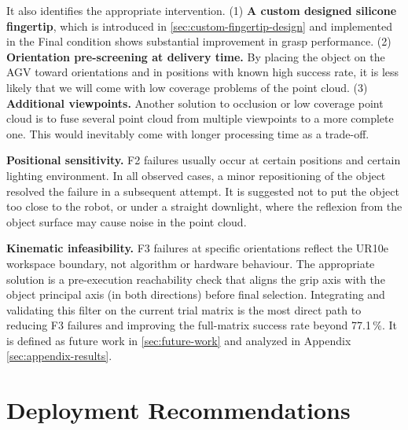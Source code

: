 \documentclass[oneside,studentpaper]{wbk}
\begin{document}


It also identifies the appropriate intervention. (1) \textbf{A custom designed silicone fingertip}, which is introduced in \cref{sec:custom-fingertip-design} and implemented in the Final condition shows substantial improvement in grasp performance. (2) \textbf{Orientation pre-screening at delivery time.} By placing the object on the AGV toward orientations and in positions with known high success rate, it is less likely that we will come with low coverage problems of the point cloud. (3) \textbf{Additional viewpoints.} Another solution to occlusion or low coverage point cloud is to fuse several point cloud from multiple viewpoints to a more complete one. This would inevitably come with longer processing time as a trade-off. 

\textbf{Positional sensitivity.} F2 failures usually occur at certain positions and certain lighting environment. In all observed cases, a minor repositioning of the object resolved the failure in a subsequent attempt. It is suggested not to put the object too close to the robot, or under a straight downlight, where the reflexion from the object surface may cause noise in the point cloud.

\textbf{Kinematic infeasibility.} F3 failures at specific orientations reflect the UR10e workspace boundary, not algorithm or hardware behaviour. The appropriate solution is a pre-execution reachability check that aligns the grip axis with the object principal axis (in both directions) before final selection. Integrating and validating this filter on the current trial matrix is the most direct path to reducing F3 failures and improving the full-matrix success rate beyond 77.1\,\%. It is defined as future work in \cref{sec:future-work} and analyzed in Appendix \cref{sec:appendix-results}.

\section{Deployment Recommendations}
\label{sec:deployment-recommendations}
\end{document}
